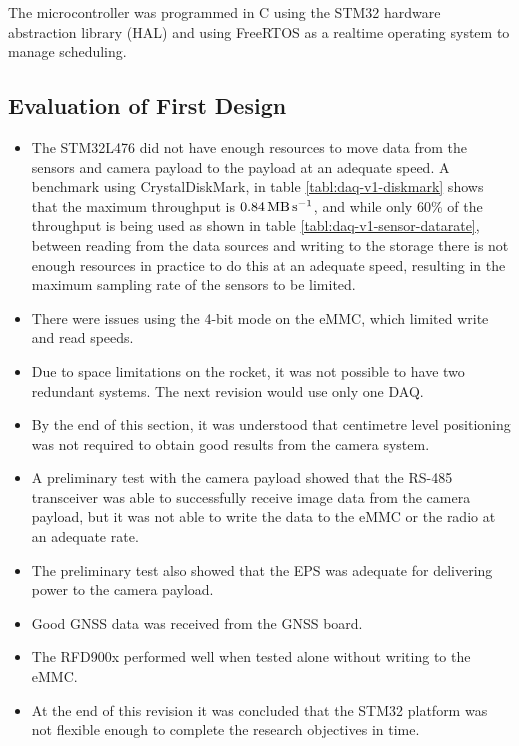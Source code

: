 \documentclass{report}
\begin{document}
The microcontroller was programmed in C using the STM32 hardware abstraction library (HAL) and using FreeRTOS as a realtime operating system to manage scheduling.

\subsection{Evaluation of First Design}

\begin{itemize}
  \item The STM32L476 did not have enough resources to move data from the sensors and camera payload to the payload at an adequate speed. A benchmark using CrystalDiskMark, in table \ref{tabl:daq-v1-diskmark} shows that the maximum throughput is $\SI{0.84}{\mega\byte\per\second}$, and while only 60\% of the throughput is being used as shown in table \ref{tabl:daq-v1-sensor-datarate}, between reading from the data sources and writing to the storage there is not enough resources in practice to do this at an adequate speed, resulting in the maximum sampling rate of the sensors to be limited.
  \item There were issues using the 4-bit mode on the eMMC, which limited write and read speeds.
  \item Due to space limitations on the rocket, it was not possible to have two redundant systems. The next revision would use only one DAQ.
  \item By the end of this section, it was understood that centimetre level positioning was not required to obtain good results from the camera system.
  \item A preliminary test with the camera payload showed that the RS-485 transceiver was able to successfully receive image data from the camera payload, but it was not able to write the data to the eMMC or the radio at an adequate rate.
  \item The preliminary test also showed that the EPS was adequate for delivering power to the camera payload.
  \item Good GNSS data was received from the GNSS board.
  \item The RFD900x performed well when tested alone without writing to the eMMC.
  \item At the end of this revision it was concluded that the STM32 platform was not flexible enough to complete the research objectives in time.
\end{itemize}
\end{document}
